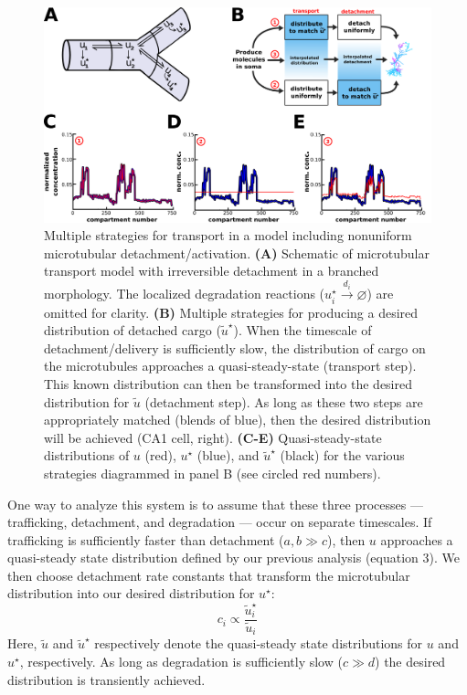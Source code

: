 \documentclass[11pt]{wlpeerj}
\begin{document}
\begin{figure}[!tb]
\begin{center}
\includegraphics[width=0.9\columnwidth]{04_sushi_belt.png}

\caption{Multiple strategies for transport in a model including nonuniform microtubular detachment/activation.
\textbf{(A)} Schematic of microtubular transport model with irreversible detachment in a branched morphology. The localized degradation reactions ($u^{\star}_i \xrightarrow{d_i} \varnothing$) are omitted for clarity.
\textbf{(B)} Multiple strategies for producing a desired distribution of detached cargo ($\tilde{u}^{\star}$). When the timescale of detachment/delivery is sufficiently slow, the distribution of cargo on the microtubules approaches a quasi-steady-state (transport step). This known distribution can then be transformed into the desired distribution for $\tilde{u}$ (detachment step). As long as these two steps are appropriately matched (blends of blue), then the desired distribution will be achieved (CA1 cell, right).
\textbf{(C-E)} Quasi-steady-state distributions of $u$ (red), $u^\star$ (blue), and $\tilde{u}^\star$ (black) for the various strategies diagrammed in panel B (see circled red numbers). }
\end{center}
\end{figure}

One way to analyze this system is to assume that these three processes --- trafficking, detachment, and degradation --- occur on separate timescales.
If trafficking is sufficiently faster than detachment ($a,b \gg c$), then $u$ approaches a quasi-steady state distribution defined by our previous analysis (equation 3).
We then choose detachment rate constants that transform the microtubular distribution into our desired distribution for $u^\star$:
\begin{equation}
c_i \propto \frac{\tilde{u}^\star_i}{\tilde{u}_i}
\end{equation}
Here, $\tilde{u}$ and $\tilde{u}^\star$ respectively denote the quasi-steady state distributions for $u$ and $u^\star$, respectively.
As long as degradation is sufficiently slow ($c \gg d$) the desired distribution is transiently achieved.
\end{document}
